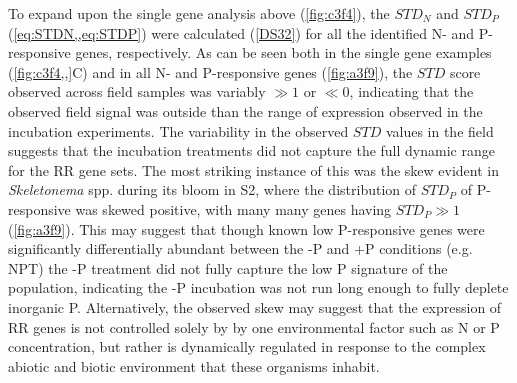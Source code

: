 To expand upon the single gene analysis above (\cref{fig:c3f4}), the $STD_N$ and $STD_P$ (\cref{eq:STDN,,eq:STDP}) were calculated (\ref{DS32}) for all the identified N- and P-responsive genes, respectively. As can be seen both in the single gene examples (\cref{fig:c3f4,,}C) and in all N- and P-responsive genes (\cref{fig:a3f9}), the $STD$ score observed across field samples was variably $\gg 1$ or $\ll 0$, indicating that the observed field signal was outside than the range of expression observed in the incubation experiments. The variability in the observed $STD$ values in the field suggests that the incubation treatments did not capture the full dynamic range for the RR gene sets. The most striking instance of this was the skew evident in \textit{Skeletonema} spp. during its bloom in S2, where the distribution of $STD_P$ of P-responsive was skewed positive, with many many genes having $STD_P \gg 1$ (\cref{fig:a3f9}). This may suggest that though known low P-responsive genes were significantly differentially abundant between the -P and +P conditions (e.g. NPT) the -P treatment did not fully capture the low P signature of the population, indicating the -P incubation was not run long enough to fully deplete inorganic P. Alternatively, the observed skew may suggest that the expression of RR genes is not controlled solely by by one environmental factor such as N or P concentration, but rather is dynamically regulated in response to the complex abiotic and biotic environment that these organisms inhabit.\par

